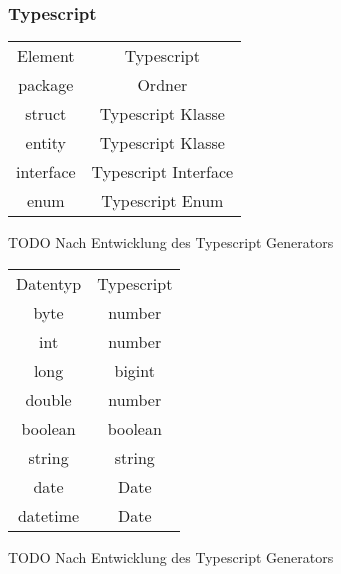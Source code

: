 \documentclass[./einleitung.tex]{subfiles}
\begin{document}
    \subsubsection{Typescript}
    \begin{center}
        \begin{tabular}{| c || c |}
            \hline
            Element   & Typescript           \\
            \hhline{|=||=|}
            package   & Ordner               \\
            \hline
            struct    & Typescript Klasse    \\
            \hline
            entity    & Typescript Klasse    \\
            \hline
            interface & Typescript Interface \\
            \hline
            enum      & Typescript Enum      \\
            \hline
        \end{tabular}
    \end{center}
    TODO Nach Entwicklung des Typescript Generators

    \begin{center}
        \begin{tabular}{| c || c |}
            \hline
            Datentyp & Typescript \\
            \hhline{|=||=|}
            byte     & number     \\
            \hline
            int      & number     \\
            \hline
            long     & bigint     \\
            \hline
            double   & number     \\
            \hline
            boolean  & boolean    \\
            \hline
            string   & string     \\
            \hline
            date     & Date       \\
            \hline
            datetime & Date       \\
            \hline
        \end{tabular}
    \end{center}
    TODO Nach Entwicklung des Typescript Generators
\end{document}
